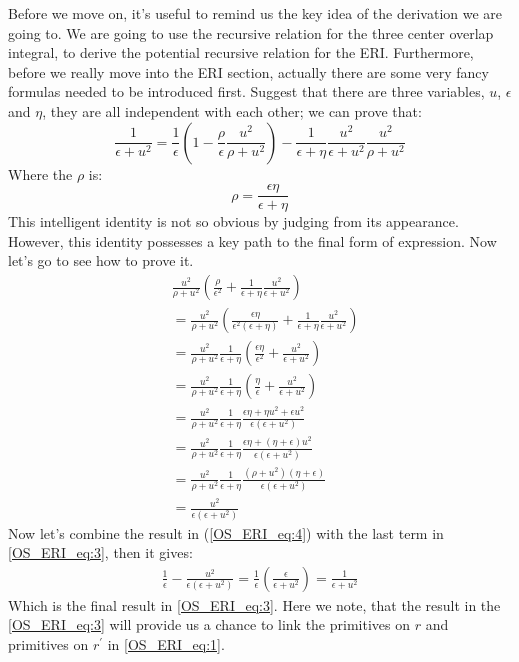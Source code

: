 Before we move on, it's useful to remind us the key idea of the derivation
we are going to. We are going to use the recursive relation for the three
center overlap integral, to derive the potential recursive relation for the
ERI. Furthermore, before we really move into the ERI section, actually there are
some very fancy formulas needed to be introduced first. Suggest that there are
three variables, $u$, $\epsilon$ and $\eta$, they are all independent with each
other; we can prove that:
\begin{equation}
 \frac{1}{\epsilon+u^{2}} = \frac{1}{\epsilon}\left( 1-\frac{\rho}{\epsilon}
\frac{u^{2}}{\rho+u^{2}}\right) - \frac{1}{\epsilon+\eta}
\frac{u^{2}}{\epsilon+u^{2}}\frac{u^{2}}{\rho+u^{2}} 
\label{OS_ERI_eq:3}
\end{equation}
Where the $\rho$ is:
\begin{equation}
 \rho = \frac{\epsilon\eta}{\epsilon+\eta}
\end{equation}
This intelligent identity is not so obvious by judging from its appearance.
However, this identity possesses a key path to the final form of expression.
Now let's go to see how to prove it.
\begin{equation}
 \begin{split}
 &\frac{u^{2}}{\rho+u^{2}}\left( \frac{\rho}{\epsilon^{2}} + 
\frac{1}{\epsilon+\eta}\frac{u^{2}}{\epsilon+u^{2}}\right) \\
&= \frac{u^{2}}{\rho+u^{2}}\left(
\frac{\epsilon\eta}{\epsilon^{2}(\epsilon+\eta)} + 
\frac{1}{\epsilon+\eta}\frac{u^{2}}{\epsilon+u^{2}}\right) \\
&= \frac{u^{2}}{\rho+u^{2}}\frac{1}{\epsilon+\eta}\left(
\frac{\epsilon\eta}{\epsilon^{2}} + 
\frac{u^{2}}{\epsilon+u^{2}}\right) \\
&= \frac{u^{2}}{\rho+u^{2}}\frac{1}{\epsilon+\eta}\left(
\frac{\eta}{\epsilon} + 
\frac{u^{2}}{\epsilon+u^{2}}\right) \\
&= \frac{u^{2}}{\rho+u^{2}}\frac{1}{\epsilon+\eta}
\frac{\epsilon\eta + \eta u^{2} + \epsilon u^{2}}{\epsilon(\epsilon+u^{2})} \\
&= \frac{u^{2}}{\rho+u^{2}}\frac{1}{\epsilon+\eta}
\frac{\epsilon\eta + (\eta+ \epsilon)u^{2}}{\epsilon(\epsilon+u^{2})} \\
&= \frac{u^{2}}{\rho+u^{2}}\frac{1}{\epsilon+\eta}
\frac{(\rho + u^{2})(\eta+ \epsilon)}{\epsilon(\epsilon+u^{2})} \\
&= \frac{u^{2}}{\epsilon(\epsilon+u^{2})}
 \end{split} 
\label{OS_ERI_eq:4}
\end{equation}
Now let's combine the result in (\ref{OS_ERI_eq:4}) with the last term in
\ref{OS_ERI_eq:3}, then it gives:
\begin{equation}
 \begin{split}
  \frac{1}{\epsilon}-\frac{u^{2}}{\epsilon(\epsilon+u^{2})}  
= \frac{1}{\epsilon}\left( \frac{\epsilon}{\epsilon+u^{2}}\right) 
= \frac{1}{\epsilon+u^{2}}
 \end{split}
\label{OS_ERI_eq:5}
\end{equation}
Which is the final result in \ref{OS_ERI_eq:3}. Here we note, that the result
in the \ref{OS_ERI_eq:3} will provide us a chance to link the primitives on 
$r$ and primitives on $r^{'}$ in \ref{OS_ERI_eq:1}.

